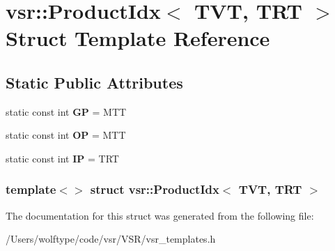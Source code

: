 \hypertarget{structvsr_1_1_product_idx_3_01_t_v_t_00_01_t_r_t_01_4}{\section{vsr\-:\-:Product\-Idx$<$ T\-V\-T, T\-R\-T $>$ Struct Template Reference}
\label{structvsr_1_1_product_idx_3_01_t_v_t_00_01_t_r_t_01_4}
}
\subsection*{Static Public Attributes}
\begin{DoxyCompactItemize}
\item 
\hypertarget{structvsr_1_1_product_idx_3_01_t_v_t_00_01_t_r_t_01_4_a2b1077bd465111f28bede232e44fa2c3}{static const int {\bfseries G\-P} = M\-T\-T}\label{structvsr_1_1_product_idx_3_01_t_v_t_00_01_t_r_t_01_4_a2b1077bd465111f28bede232e44fa2c3}

\item 
\hypertarget{structvsr_1_1_product_idx_3_01_t_v_t_00_01_t_r_t_01_4_a3a3bc70dd2b2072d90bff7c01a716cf7}{static const int {\bfseries O\-P} = M\-T\-T}\label{structvsr_1_1_product_idx_3_01_t_v_t_00_01_t_r_t_01_4_a3a3bc70dd2b2072d90bff7c01a716cf7}

\item 
\hypertarget{structvsr_1_1_product_idx_3_01_t_v_t_00_01_t_r_t_01_4_ade2c10f70190e825c46d62380ea2f7cb}{static const int {\bfseries I\-P} = T\-R\-T}\label{structvsr_1_1_product_idx_3_01_t_v_t_00_01_t_r_t_01_4_ade2c10f70190e825c46d62380ea2f7cb}

\end{DoxyCompactItemize}
\subsubsection*{template$<$$>$ struct vsr\-::\-Product\-Idx$<$ T\-V\-T, T\-R\-T $>$}



The documentation for this struct was generated from the following file\-:\begin{DoxyCompactItemize}
\item 
/\-Users/wolftype/code/vsr/\-V\-S\-R/vsr\-\_\-templates.\-h\end{DoxyCompactItemize}
